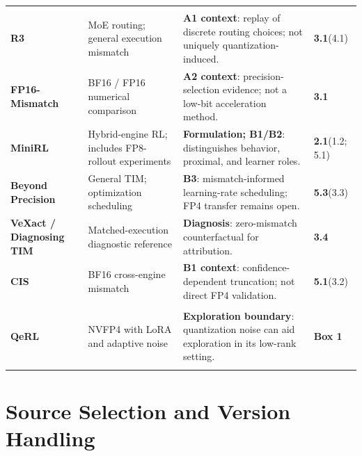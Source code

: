 \begin{longtable}{@{}P{29mm}P{37mm}P{59mm}P{29mm}@{}}
\addlinespace[3pt]
\\*
\textbf{R3} \citep{r3} & MoE routing; general execution mismatch & \textbf{A1 context}: replay of discrete routing choices; not uniquely quantization-induced. & \textbf{3.1}\newline(4.1) \\[6pt]
\textbf{FP16-Mismatch} \citep{fp16} & BF16 / FP16 numerical comparison & \textbf{A2 context}: precision-selection evidence; not a low-bit acceleration method. & \textbf{3.1} \\[6pt]
\textbf{MiniRL} \citep{minirl} & Hybrid-engine RL; includes FP8-rollout experiments & \textbf{Formulation; B1/B2}: distinguishes behavior, proximal, and learner roles. & \textbf{2.1}\newline(1.2; 5.1) \\[6pt]
\textbf{Beyond Precision} \citep{beyond} & General TIM; optimization scheduling & \textbf{B3}: mismatch-informed learning-rate scheduling; FP4 transfer remains open. & \textbf{5.3}\newline(3.3) \\[6pt]
\textbf{VeXact / Diagnosing TIM} \citep{vexact} & Matched-execution diagnostic reference & \textbf{Diagnosis}: zero-mismatch counterfactual for attribution. & \textbf{3.4} \\[6pt]
\textbf{CIS} \citep{cis} & BF16 cross-engine mismatch & \textbf{B1 context}: confidence-dependent truncation; not direct FP4 validation. & \textbf{5.1}\newline(3.2) \\[6pt]
\addlinespace[3pt]
\\*
\textbf{QeRL} \citep{qerl} & NVFP4 with LoRA and adaptive noise & \textbf{Exploration boundary}: quantization noise can aid exploration in its low-rank setting. & \textbf{Box 1} \\[6pt]
\addlinespace[3pt]
\end{longtable}
\endgroup

\section{Source Selection and Version Handling}\label{app:protocol}
